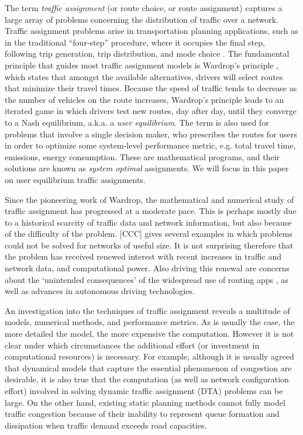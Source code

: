 The term \textit{traffic assignment} (or route choice, or route assignment) captures a large array of problems concerning the distribution of traffic over a network. Traffic assignment problems arise in transportation planning applications, such as in the traditional ``four-step'' procedure, where it occupies the final step, following trip generation, trip distribution, and mode choice \cite{mcnally2007four}.  The fundamental principle that guides most traffic assignment models is Wardrop's principle \cite{wardrop1952some}, which states that amongst the available alternatives, drivers will select routes that minimize their travel times. Because the speed of traffic tends to decrease as the number of vehicles on the route increases, Wardrop's principle leads to an iterated game in which drivers test new routes, day after day, until they converge to a Nash equilibrium, a.k.a. a \textit{user equilibrium}. The term is also used for problems that involve a single decision maker, who prescribes the routes for users in order to optimize some system-level performance metric, e.g. total travel time, emissions, energy consumption. These are mathematical programs, and their solutions are known as \textit{system optimal} assignments. We will focus in this paper on user equilibrium traffic assignments.

Since the pioneering work of Wardrop, the mathematical and numerical study of traffic assignment has progressed at a moderate pace. This is perhaps mostly due to a historical scarcity of traffic data and network information, but also because of the difficulty of the problem. [CCC] gives several examples in which problems could not be solved for networks of useful size. It is not surprising therefore that the problem has received renewed interest with recent increases in traffic and network data, and computational power. Also driving this renewal are concerns about the `unintended consequences' of the widespread use of routing apps \cite{traffic_apps}, as well as advances in autonomous driving technologies.

An investigation into the techniques of traffic assignment reveals a multitude of models, numerical methods, and performance metrics. As is usually the case, the more detailed the model, the more expensive the computation. However it is not clear under which circumstances the additional effort (or investment in computational resources) is necessary. For example, although it is usually agreed that dynamical models that capture the essential phenomenon of congestion are desirable, it is also true that the computation (as well as network configuration effort) involved in solving dynamic traffic assignment (DTA) problems can be large. On the other hand, existing static planning methods cannot fully model traffic congestion because of their inability to represent queue formation and dissipation when traffic demand exceeds road capacities\cite{nie2010solving}. 

